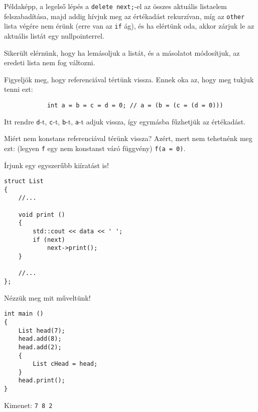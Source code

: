 \documentclass[a4paper,11.5pt]{article}
\begin{document}
	Példaképp, a legelső lépés a \texttt{delete next;}-el az összes aktuális listaelem felszabadítása, majd addig hívjuk meg az értékadást rekurzívan, míg az \texttt{other} lista végére nem érünk (erre van az \texttt{if} ág), és ha elértünk oda, akkor zárjuk le az aktuális listát egy nullpointerrel. 
	
	Sikerült elérnünk, hogy ha lemásoljuk a listát, és a másolatot módosítjuk, az eredeti lista nem fog változni.
	\medskip
	
	Figyeljök meg, hogy referenciával tértünk vissza. Ennek oka az, hogy meg tukjuk tenni ezt:
	\begin{lstlisting}
			int a = b = c = d = 0; // a = (b = (c = (d = 0)))
	\end{lstlisting}
	Itt rendre \texttt{d}-t, \texttt{c}-t, \texttt{b}-t, \texttt{a}-t adjuk vissza, így egymásba fűzhetjük az értékadást.
	\begin{note}
		Miért nem konstans referenciával térünk vissza? Azért, mert nem tehetnénk meg ezt: (legyen \texttt{f} egy nem konstanst váró függvény) \texttt{f(a = 0)}.
	\end{note}
	
	Írjunk egy egyszerűbb kiíratást is!
	\begin{lstlisting}
struct List
{
	//...
	
	void print ()
	{
		std::cout << data << ' ';
		if (next)
			next->print();
	}
	
	//...
};
	\end{lstlisting}
	Nézzük meg mit műveltünk!
	\begin{lstlisting}
int main ()
{
	List head(7);
	head.add(8);
	head.add(2);
	{
		List cHead = head;
	}
	head.print();
}
	\end{lstlisting}
	Kimenet: \texttt{7 8 2}
	
\end{document}

